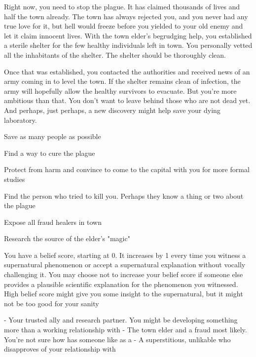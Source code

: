 \documentclass[char]{Pestilence}
\begin{document}
Right now, you need to stop the plague. It has claimed thousands of lives and half the town already. The town has always rejected you, and you never had any true love for it, but hell would freeze before you yielded to your old enemy and let it claim innocent lives. With the town elder's begrudging help, you established a sterile shelter for the few healthy individuals left in town. You personally vetted all the inhabitants of the shelter. The shelter should be thoroughly clean. 

Once that was established, you contacted the authorities and received news of an army coming in to level the town. If the shelter remains clean of infection, the army will hopefully allow the healthy survivors to evacuate. But you're more ambitious than that. You don't want to leave behind those who are not dead yet. And perhaps, just perhaps, a new discovery might help save your dying laboratory.

\begin{itemz}[Goals]
	\item Save as many people as possible
	\item Find a way to cure the plague
	\item Protect \cRebel{} from harm and convince \cRebel{\them} to come to the capital with you for more formal studies 
	\item Find the person who tried to kill you. Perhaps they know a thing or two about the plague
	\item Expose all fraud healers in town
	\item Research the source of the elder's "magic"
\end{itemz}

\begin{itemz}[Notes]
	\item You have a belief score, starting at 0. It increases by 1 every time you witness a supernatural phenomenon or accept a supernatural explanation without vocally challenging it. You may choose not to increase your belief score if someone else provides a plausible scientific explanation for the phenomenon you witnessed. High belief score might give you some insight to the supernatural, but it might not be too good for your sanity
\end{itemz}

\begin{contacts}
	\contact{\cRebel{}} - Your trusted ally and research partner. You might be developing something more than a working relationship with \cRebel{\them}
	\contact{\cElder{}} - The town elder and a fraud most likely. You're not sure how \cRebel{} has someone like \cElder{\them} as a \cElder{\parent}
	\contact{\cApprentice{}} - A superstitious, unlikable \cApprentice{\human} who disapproves of your relationship with \cRebel{}
\end{contacts}
\end{document}
